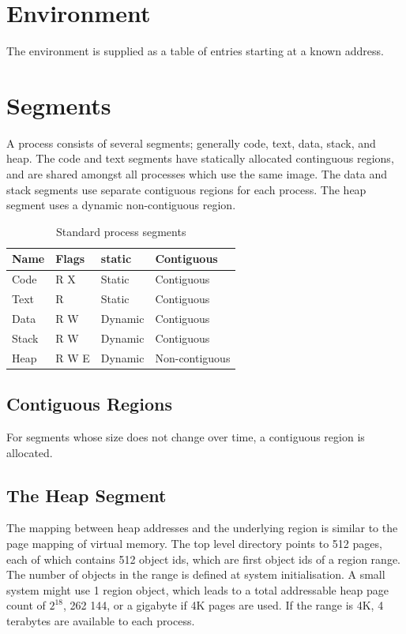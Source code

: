 \section{Environment}

The environment is supplied as a table of entries starting at a known address.

\section{Segments}

A process consists of several segments; generally code, text, data, stack, and heap.  The code and text segments have statically allocated continguous regions, and are shared amongst all processes which use the same image.  The data and stack segments use separate contiguous regions for each process.  The heap segment uses a dynamic non-contiguous region.

\begin{table}[ht]
\begin{tabular}{l l l l}
\hline\hline
Name & Flags & static & Contiguous \\
\hline
Code & R X & Static & Contiguous \\
Text & R & Static & Contiguous \\
Data & R W & Dynamic & Contiguous \\
Stack & R W & Dynamic & Contiguous \\
Heap & R W E & Dynamic & Non-contiguous \\
\hline
\end{tabular}
\caption{Standard process segments}
\label{table:standard-process-segments}
\end{table}

\subsection{Contiguous Regions}

For segments whose size does not change over time, a contiguous region is allocated.

\subsection{The Heap Segment}

The mapping between heap addresses and the underlying region is similar to the page mapping of virtual memory.  The top level directory points to 512 pages, each of which contains 512 object ids, which are first object ids of a region range.  The number of objects in the range is defined at system initialisation.  A small system might use 1 region object, which leads to a total addressable heap page count of $2^{18}$, 262 144, or a gigabyte if 4K pages are used.  If the range is 4K, 4 terabytes are available to each process.
